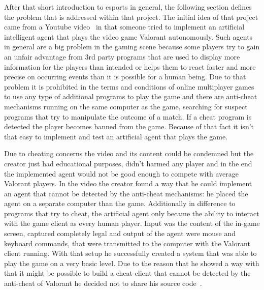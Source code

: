 After that short introduction to esports in general, the following section defines the problem that is 
addressed within that project. The initial idea of that project came from a Youtube 
video~\cite{river2021} in that someone tried to implement an artificial intelligent agent that plays the 
video game Valorant autonomously.
Such agents in general are a big problem in the gaming scene because some players try to gain an 
unfair advantage from 3rd party programs that are used to display more information for the players 
than intended or helps them to react faster and more precise on occurring events than it is possible 
for a human being. Due to that problem it is prohibited in the terms and conditions of online 
multiplayer games to use any type of additional programs to play the game and there are anti-cheat 
mechanisms running on the same computer as the game, searching for suspect programs that try to 
manipulate the outcome of a match. If a cheat program is detected the player becomes banned from 
the game. Because of that fact it isn't that easy to implement and test an artificial agent that plays 
the game.

Due to cheating concerns the video and its content could be condemned but the creator just had 
educational purposes, didn't harmed any player and in the end the implemented agent would not be 
good enough to compete with average Valorant players. In the video the creator found a way that he 
could implement an agent that cannot be detected by the anti-cheat mechanisms: he placed the 
agent on a separate computer than the game. Additionally in difference to programs that try to 
cheat, the artificial agent only became the ability to interact with the game client as every human 
player. Input was the content of the in-game screen, captured completely legal and output of the 
agent were mouse and keyboard commands, that were transmitted to the computer with the 
Valorant client running. With that setup he successfully created a system that was able to play the 
game on a very basic level. Due to the reason that he showed a way with that it might be possible to 
build a cheat-client that cannot be detected by the anti-cheat of Valorant he decided not to share 
his source code~\cite{river2021}.

